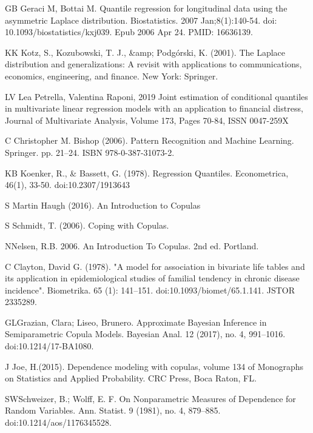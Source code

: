 \documentclass[mstat,12pt]{unswthesis}  %
\numberwithin{equation}{section}
\begin{document}
\clearpage
{}


\begin{thebibliography}{999}

\bibitem
{GB} Geraci M, Bottai M. Quantile regression for longitudinal data using the asymmetric Laplace distribution. Biostatistics. 2007 Jan;8(1):140-54. doi: 10.1093/biostatistics/kxj039. Epub 2006 Apr 24. PMID: 16636139.

\bibitem
{KK} Kotz, S., Kozubowski, T. J., &amp; Podgórski, K. (2001). The Laplace distribution and generalizations: A revisit with applications to communications, economics, engineering, and finance. New York: Springer.

\bibitem
{LV} Lea Petrella, Valentina Raponi, 2019
Joint estimation of conditional quantiles in multivariate linear regression models with an application to financial distress,
Journal of Multivariate Analysis, Volume 173, Pages 70-84,
ISSN 0047-259X

\bibitem
{C} Christopher M. Bishop (2006). Pattern Recognition and Machine Learning. Springer. pp. 21–24. ISBN 978-0-387-31073-2.

\bibitem
{KB} Koenker, R., & Bassett, G. (1978). Regression Quantiles. Econometrica, 46(1), 33-50. doi:10.2307/1913643

\bibitem
{S}  Martin Haugh (2016). An Introduction to Copulas

\bibitem
{S} Schmidt, T. (2006). Coping with Copulas.

\bibitem
{N}Nelsen, R.B. 2006. An Introduction To Copulas. 2nd ed. Portland.

\bibitem
{C}  Clayton, David G. (1978). "A model for association in bivariate life tables and its application in epidemiological studies of familial tendency in chronic disease incidence". Biometrika. 65 (1): 141–151. doi:10.1093/biomet/65.1.141. JSTOR 2335289.

\bibitem
{GL}Grazian, Clara; Liseo, Brunero. Approximate Bayesian Inference in Semiparametric Copula Models. Bayesian Anal. 12 (2017), no. 4, 991--1016. doi:10.1214/17-BA1080.

\bibitem
{J} Joe, H.(2015). Dependence modeling with copulas, volume 134 of Monographs on Statistics
and Applied Probability. CRC Press, Boca Raton, FL.

\bibitem
{SW}Schweizer, B.; Wolff, E. F. On Nonparametric Measures of Dependence for Random Variables. Ann. Statist. 9 (1981), no. 4, 879--885. doi:10.1214/aos/1176345528. 




\end{thebibliography}
\end{document}
